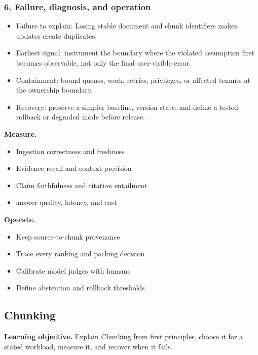 \subsubsection*{6. Failure, diagnosis, and operation}
\begin{itemize}
\item Failure to explain: Losing stable document and chunk identifiers makes updates create duplicates.
\item Earliest signal: instrument the boundary where the violated assumption first becomes observable, not only the final user-visible error.
\item Containment: bound queues, work, retries, privileges, or affected tenants at the ownership boundary.
\item Recovery: preserve a simpler baseline, version state, and define a tested rollback or degraded mode before release.
\end{itemize}
\textbf{Measure.}\begin{itemize}
\item Ingestion correctness and freshness
\item Evidence recall and context precision
\item Claim faithfulness and citation entailment
\item answer quality, latency, and cost
\end{itemize}
\textbf{Operate.}\begin{itemize}
\item Keep source-to-chunk provenance
\item Trace every ranking and packing decision
\item Calibrate model judges with humans
\item Define abstention and rollback thresholds
\end{itemize}
\subsection{Chunking}
\textbf{Learning objective.} Explain Chunking from first principles, choose it for a stated workload, measure it, and recover when it fails.
